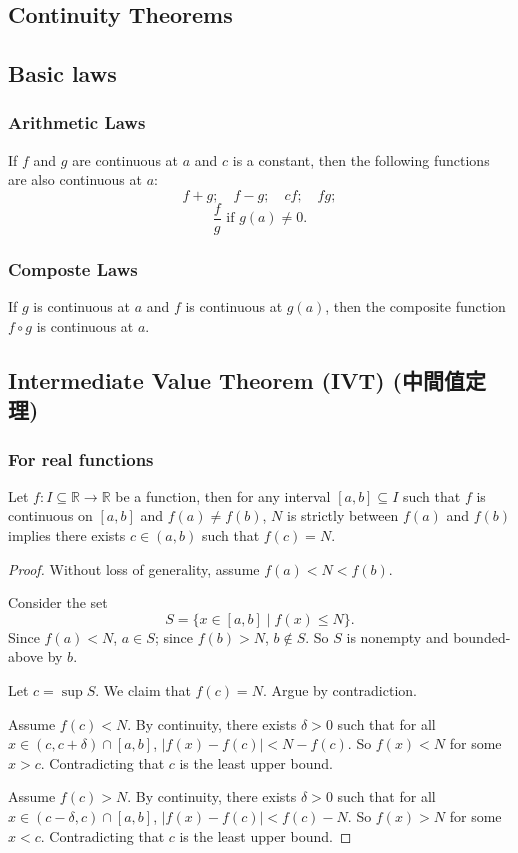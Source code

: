 \documentclass[a4paper,12pt]{report}
\begin{document}
\begin{itemize}
\begin{itemize}
\section{Continuity Theorems}
\subsection{Basic laws}
\subsubsection{Arithmetic Laws}
If $f$ and $g$ are continuous at $a$ and $c$ is a constant, then the following functions are also continuous at $a$:
\[f+g;\quad f-g;\quad cf;\quad fg;\]
\[\frac{f}{g}\text{\ if\ }g(a)\neq 0.\]
\subsubsection{Composte Laws}
If $g$ is continuous at $a$ and $f$ is continuous at $g(a)$, then the composite function $f\circ g$ is continuous at $a$.
\subsection{Intermediate Value Theorem (IVT) (中間值定理)}
\subsubsection{For real functions}
Let $f\colon I\subseteq\mathbb{R}\to\mathbb{R}$ be a function, then for any interval $[a,b]\subseteq I$ such that $f$ is continuous on $[a,b]$ and $f(a)\neq f(b)$, $N$ is strictly between $f(a)$ and $f(b)$ implies there exists $c\in (a,b)$ such that $f(c)=N$.
\begin{proof}
Without loss of generality, assume $f(a)<N<f(b)$.

Consider the set
\[S=\{x\in [a,b]\mid f(x)\leq N\}.\]
Since $f(a)<N$, $a\in S$; since $f(b)>N$, $b\notin S$. So $S$ is nonempty and bounded-above by $b$.

Let $c=\sup S$. We claim that $f(c)=N$. Argue by contradiction.

Assume $f(c)<N$. By continuity, there exists $\delta>0$ such that for all $x\in (c,c+\delta)\cap [a,b]$, $|f(x)-f(c)|<N-f(c)$. So $f(x)<N$ for some $x>c$. Contradicting that $c$ is the least upper bound.

Assume $f(c)>N$. By continuity, there exists $\delta>0$ such that for all $x\in (c-\delta,c)\cap [a,b]$, $|f(x)-f(c)|<f(c)-N$. So $f(x)>N$ for some $x<c$. Contradicting that $c$ is the least upper bound.


\end{proof}
\end{itemize}
\end{itemize}
\end{document}
